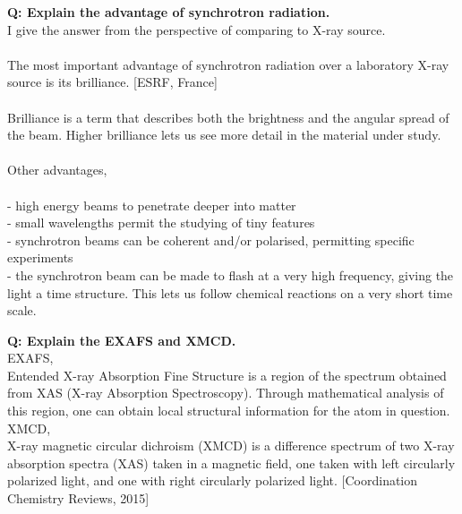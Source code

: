 \documentclass{article}
\begin{document}
\newpage
\noindent \textbf{Q: Explain the advantage of synchrotron radiation.}\\
\noindent I give the answer from the perspective of comparing to X-ray source.\\
\noindent \\
\noindent The most important advantage of synchrotron radiation over a laboratory X-ray source is its brilliance. [ESRF, France]\\
\noindent \\
\noindent Brilliance is a term that describes both the brightness and the angular spread of the beam. Higher brilliance lets us see more detail in the material under study.\\
\noindent \\
\noindent Other advantages,\\
\noindent \\
\noindent - high energy beams to penetrate deeper into matter\\
\noindent - small wavelengths permit the studying of tiny features\\
\noindent - synchrotron beams can be coherent and/or polarised, permitting specific experiments\\
\noindent - the synchrotron beam can be made to flash at a very high frequency, giving the light a time structure. This lets us follow chemical reactions on a very short time scale.


\newpage
\noindent \textbf{Q: Explain the EXAFS and XMCD.}\\
\noindent EXAFS,\\
\noindent Entended X-ray Absorption Fine Structure is a region of the spectrum obtained from XAS (X-ray Absorption Spectroscopy). Through mathematical analysis of this region, one can obtain local structural information for the atom in question.\\
\noindent XMCD,\\
\noindent X-ray magnetic circular dichroism (XMCD) is a difference spectrum of two X-ray absorption spectra (XAS) taken in a magnetic field, one taken with left circularly polarized light, and one with right circularly polarized light. [Coordination Chemistry Reviews, 2015]
\end{document}
